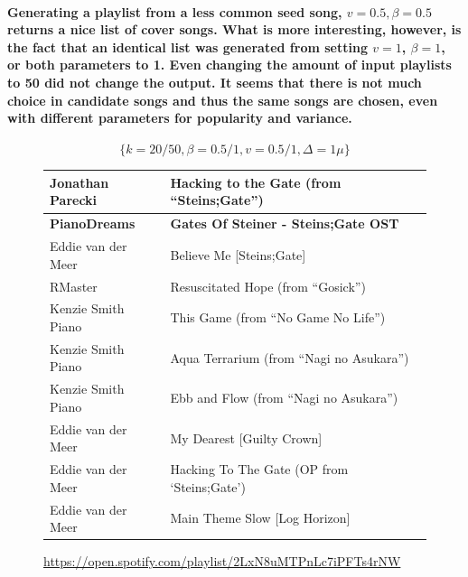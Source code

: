 \documentclass[a4paper, 12pt]{report}
\begin{document}
\paragraph{Generating a playlist from a less common seed song, \(v = 0.5, \beta = 0.5\) returns a nice list of cover songs. What is more interesting, however, is the fact that
an identical list was generated from setting \(v = 1\), \(\beta = 1\), or both parameters to 1. Even changing the amount of input playlists to 50 did not change the output.
It seems that there is not much choice in candidate songs and thus the same songs are chosen, even with different parameters for popularity and variance.}
\[\{k = 20/50, \beta = 0.5/1, v = 0.5/1, \Delta = 1\mu\}\]
\begin{center}
    \begin{figure}[H]
        \begin{tabulary}{\linewidth}{|@{\makebox[2em][c]{\rownumber}}|L|L|} 
            \hline
            Jonathan Parecki & Hacking to the Gate (from ``Steins;Gate'') \\ 
            \hline
            \textbf{PianoDreams} & \textbf{Gates Of Steiner - Steins;Gate OST} \\
            \hline
            Eddie van der Meer & Believe Me [Steins;Gate] \\
            \hline
            RMaster & Resuscitated Hope (from ``Gosick'') \\
            \hline
            Kenzie Smith Piano & This Game (from ``No Game No Life'') \\
            \hline
            Kenzie Smith Piano & Aqua Terrarium (from ``Nagi no Asukara'') \\
            \hline
            Kenzie Smith Piano & Ebb and Flow (from ``Nagi no Asukara'') \\
            \hline
            Eddie van der Meer & My Dearest [Guilty Crown] \\
            \hline
            Eddie van der Meer & Hacking To The Gate (OP from `Steins;Gate') \\
            \hline
            Eddie van der Meer & Main Theme Slow [Log Horizon] \\
            \hline
        \end{tabulary}
    \caption{\url{https://open.spotify.com/playlist/2LxN8uMTPnLc7iPFTs4rNW}}
    \label{fig:steins}
    \end{figure}
\end{center}
\end{document}
